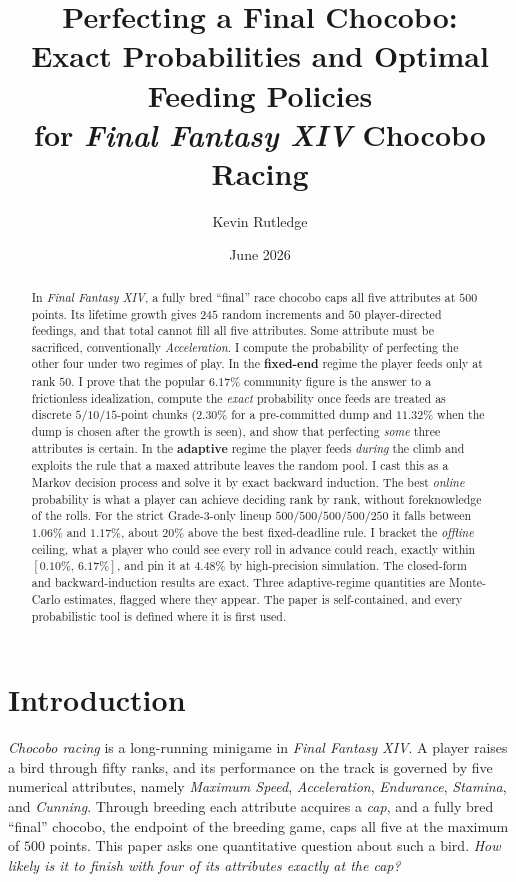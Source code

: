\documentclass[11pt]{article}
\title{\bfseries Perfecting a Final Chocobo:\\
Exact Probabilities and Optimal Feeding Policies\\
for \emph{Final Fantasy XIV} Chocobo Racing}
\author{Kevin Rutledge}
\date{June 2026}
\theoremstyle{remark}
\begin{document}
\maketitle

\begin{abstract}
In \emph{Final Fantasy XIV}, a fully bred ``final'' race chocobo caps all five
attributes at $500$ points. Its lifetime growth gives $245$ random increments and
$50$ player-directed feedings, and that total cannot fill all five attributes. Some
attribute must be sacrificed, conventionally \emph{Acceleration}. I compute the
probability of perfecting the other four under two regimes of play. In the
\textbf{fixed-end} regime the player feeds only at rank $50$. I prove that the
popular $6.17\%$ community figure is the answer to a frictionless idealization,
compute the \emph{exact} probability once feeds are treated as discrete
$5/10/15$-point chunks ($2.30\%$ for a pre-committed dump and $11.32\%$ when the
dump is chosen after the growth is seen), and show that perfecting \emph{some} three
attributes is certain. In the \textbf{adaptive} regime the player feeds
\emph{during} the climb and exploits the rule that a maxed attribute leaves the
random pool. I cast this as a Markov decision process and solve it by exact
backward induction. The best \emph{online} probability is what a player can achieve
deciding rank by rank, without foreknowledge of the rolls. For the strict
Grade-3-only lineup $500/500/500/500/250$ it falls between $1.06\%$ and $1.17\%$,
about $20\%$ above the best fixed-deadline rule. I bracket the \emph{offline}
ceiling, what a player who could see every roll in advance could reach, exactly
within $[0.10\%,\,6.17\%]$, and pin it at $4.48\%$ by high-precision simulation. The
closed-form and backward-induction results are exact. Three adaptive-regime
quantities are Monte-Carlo estimates, flagged where they appear. The paper is
self-contained, and every probabilistic tool is defined where it is first used.
\end{abstract}

\tableofcontents
\bigskip

\section{Introduction}\label{sec:intro}

\emph{Chocobo racing} is a long-running minigame in \emph{Final Fantasy XIV}. A
player raises a bird through fifty ranks, and its performance on the track is
governed by five numerical attributes, namely \emph{Maximum Speed},
\emph{Acceleration}, \emph{Endurance}, \emph{Stamina}, and \emph{Cunning}. Through
breeding each attribute acquires a \emph{cap}, and a fully bred ``final'' chocobo,
the endpoint of the breeding game, caps all five at the maximum of $500$ points.
This paper asks one quantitative question about such a bird. \emph{How likely is it
to finish with four of its attributes exactly at the cap?}
\end{document}
